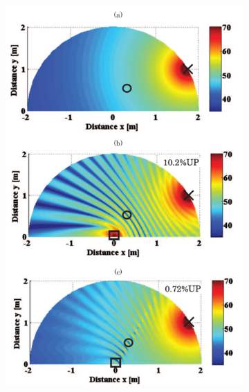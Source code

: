 \begin{figure}[!htb]
    \centering
    \begin{subfigure}{0.4\textwidth}
        \centering
        \includegraphics[width = \textwidth]{fig/tanaka2010jasa_fig11_resize.png}
    \end{subfigure}
    \begin{subfigure}{0.4\textwidth}
        \centering

\end{subfigure}
\end{figure}
